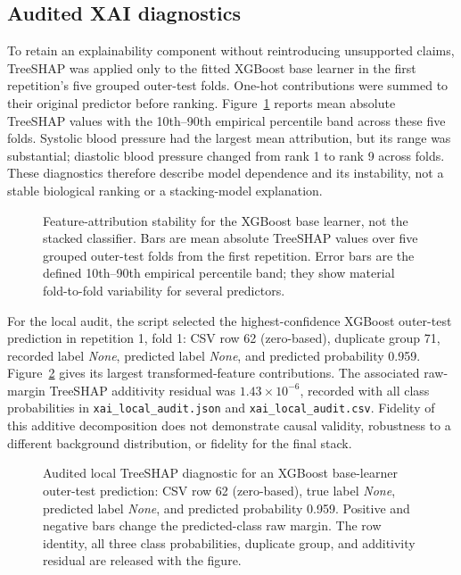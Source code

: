 \subsection{Audited XAI diagnostics}

To retain an explainability component without reintroducing unsupported claims, TreeSHAP was applied only to the fitted XGBoost base learner in the first repetition's five grouped outer-test folds. One-hot contributions were summed to their original predictor before ranking. Figure~\ref{fig:xai-stability-revision} reports mean absolute TreeSHAP values with the 10th--90th empirical percentile band across these five folds. Systolic blood pressure had the largest mean attribution, but its range was substantial; diastolic blood pressure changed from rank 1 to rank 9 across folds. These diagnostics therefore describe model dependence and its instability, not a stable biological ranking or a stacking-model explanation.

\begin{figure}[width=\textwidth,pos=!tbp,align=\centering]
\centering
{}
\caption{Feature-attribution stability for the XGBoost base learner, not the stacked classifier. Bars are mean absolute TreeSHAP values over five grouped outer-test folds from the first repetition. Error bars are the defined 10th--90th empirical percentile band; they show material fold-to-fold variability for several predictors.}
\label{fig:xai-stability-revision}
\end{figure}

For the local audit, the script selected the highest-confidence XGBoost outer-test prediction in repetition 1, fold 1: CSV row 62 (zero-based), duplicate group 71, recorded label \emph{None}, predicted label \emph{None}, and predicted probability 0.959. Figure~\ref{fig:xai-local-revision} gives its largest transformed-feature contributions. The associated raw-margin TreeSHAP additivity residual was $1.43\times10^{-6}$, recorded with all class probabilities in \texttt{xai\_local\_audit.json} and \texttt{xai\_local\_audit.csv}. Fidelity of this additive decomposition does not demonstrate causal validity, robustness to a different background distribution, or fidelity for the final stack.

\begin{figure}[width=\textwidth,pos=!tbp,align=\centering]
\centering
{}
\caption{Audited local TreeSHAP diagnostic for an XGBoost base-learner outer-test prediction: CSV row 62 (zero-based), true label \emph{None}, predicted label \emph{None}, and predicted probability 0.959. Positive and negative bars change the predicted-class raw margin. The row identity, all three class probabilities, duplicate group, and additivity residual are released with the figure.}
\label{fig:xai-local-revision}
\end{figure}


